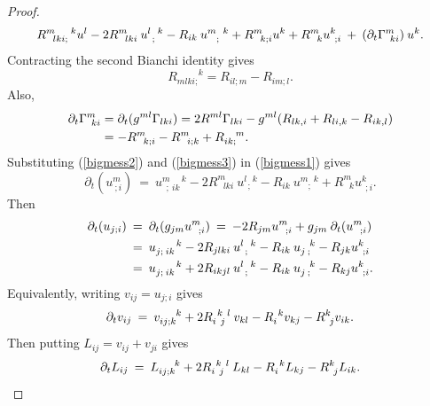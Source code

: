\begin{proof}
\begin{align}
R^{m \: \: \: \: \: \: \: k}_{\: \: \: lki;} u^l -
2 R^m_{\: \: \: lki} \: u^{l \: \: \: k}_{\: \: ;} - R_{ik} \:
u^{m \: \: \: k}_{\: \: \: \: ;}
+ R^m_{\: \: \: k;i} u^k +
R^m_{\: \: \: k} u^k_{\: \: ;i} \: + \:
(\partial_t \Gamma^m_{\: \: ki}) \: u^k. \notag
\end{align}
Contracting the second Bianchi identity gives
\begin{equation} \label{bigmess2}
R_{mlki;}^{\: \: \: \: \: \: \: \: \: \: \: k} = R_{il;m} - R_{im;l}.
\end{equation}
Also,
\begin{align} \label{bigmess3}
\partial_t \Gamma^m_{\: \: ki} & = \partial_t ( g^{ml} \Gamma_{lki}) =
2 R^{ml} \Gamma_{lki} - g^{ml} (R_{lk,i} + R_{li,k} - R_{ik,l}) \\
& = - R^m_{\: \: \: k;i} - R^m_{\: \: \: i;k} +
R^{\: \: \: \: \: m}_{ik;}.  \notag
\end{align}
Substituting (\ref{bigmess2}) and (\ref{bigmess3}) in (\ref{bigmess1})
gives
\begin{equation}
\partial_t (u^m_{\: ; i}) \: = \:
u^{m \: \: \: \: \: \: k}_{\: \: ;\:ik} -
2 R^m_{\: \: \: lki} \: u^{l \: \: \: k}_{\: \: ;} - R_{ik} \:
u^{m \: \: \: k}_{\: \: \: \: ;} +
R^m_{\: \: \: k} u^k_{\: \: ;i}.
\end{equation}
Then
\begin{align}
\partial_t (u_{j ; i}) \: & = \:
\partial_t (g_{jm} u^m_{\: \: \: ; i}) \: = \:
-2 R_{jm} u^m_{\: \: \: ; i} + g_{jm} \: \partial_t (u^m_{\: \: \: ; i}) \\
& = \:
u^{\: \: \: \: \: \: \: \: \: k}_{j  ;\:ik} -
2 R_{jlki} \: u^{l \: \: \: k}_{\: \: ;} - R_{ik} \:
u^{\: \: \: \: k}_{j  \: ;} -
R_{jk} u^k_{\: \: ;i} \notag \\
& = \:
u^{\: \: \: \: \: \: \: \: \: k}_{j  ;\:ik} +
2 R_{ikjl} \: u^{l \: \: \: k}_{\: \: ;} - R_{ik} \:
u^{\: \: \: \: k}_{j  \: ;} -
R_{kj} u^k_{\: \: ;i}. \notag
\end{align}
Equivalently, writing $v_{ij} = u_{j ; i}$ gives
\begin{equation}
\partial_t v_{ij} \:  = \:
v^{\: \: \: \: \: \: \: k}_{ij  ;k} +
2 R^{\: \: k \: \: l}_{i \: \: j} \: v_{kl} - R_{i}^{\: \: k}
v_{kj} -
R^k_{\: \: j} v_{ik}. \notag
\end{equation}
Then putting $L_{ij} = v_{ij} + v_{ji}$ gives
\begin{equation}
\partial_t L_{ij} \:  = \:
L_{ij;k}^{\: \: \: \: \: \: \: k} +
2 R^{\: \: k \: \: l}_{i \: \: j} \: L_{kl} - R_{i}^{\: \: k}
L_{kj} -
R^k_{\: \: j} L_{ik}.  \notag
\end{equation}


\end{proof}

